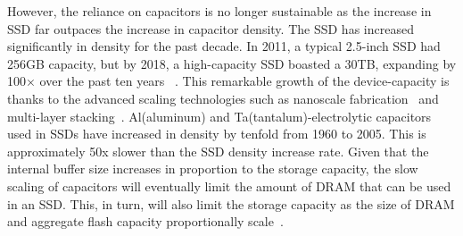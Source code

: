 
However, the  reliance on capacitors is no longer sustainable as the increase in SSD far outpaces 
the increase in capacitor density.
The SSD has increased significantly in density for the past decade. 
In 2011, a typical 2.5-inch SSD had 256GB capacity, but
by 2018, a high-capacity SSD boasted a 30TB, expanding by 100× over the past ten years
~\cite{samsung2011, anandtech18samsung}. 
This remarkable growth of the device-capacity is thanks to the advanced scaling technologies 
such as nanoscale fabrication~\cite{busche2014design} and multi-layer stacking~\cite{9365809}. 
Al(aluminum) and Ta(tantalum)-electrolytic capacitors used in SSDs 
have increased in density by tenfold from 1960 to 2005. 
This is approximately 50x slower than the SSD density increase rate.
Given that the internal buffer size increases in proportion to the storage capacity,
the slow scaling of capacitors will eventually limit the amount of DRAM that can be used in an SSD. 
This, in turn, will also limit the storage capacity as the size of DRAM and aggregate flash capacity proportionally scale~\cite{samsung_ratio, ni2017hash}. 

\iffalse
the density gap between capacitance and memory technologies 
imposes an intrinsic limitation on the current architecture wherein 
the entire buffer is fully protected by capacitors. 
\fi

